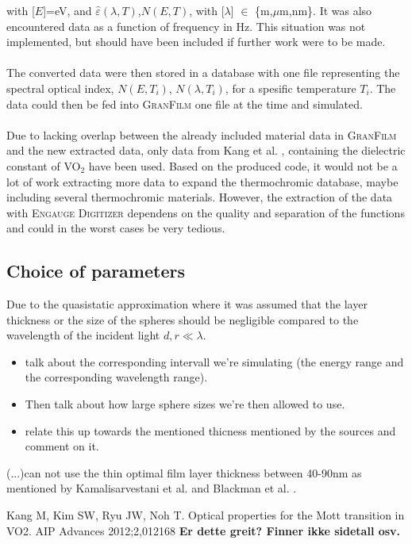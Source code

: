 with [$E$]=eV, and $\widehat\varepsilon(\lambda,T)$,$N(E,T)$, with [$\lambda$] $\in$ \{m,$\mu$m,nm\}. 
It was also encountered data as a function of frequency in Hz. This situation was not implemented, 
but should have been included if further work were to be made. 
\\
\\
The converted data were then stored in a database with one file representing the spectral 
optical index, $N(E,T_i)$, $N(\lambda,T_i)$, for a spesific temperature $T_i$. The data could then 
be fed into \textsc{GranFilm} one file at the time and simulated. 
\\
\\
Due to lacking overlap between the already included material data in \textsc{GranFilm} and the new extracted
data, only data from Kang et al. \cite[p.~3]{Kang2012}, containing the dielectric constant of 
VO$_2$ have been used. 
Based on the produced code, it would not be a lot of work extracting more data 
to expand the thermochromic database, maybe including several thermochromic materials. However, the
extraction of the data with \textsc{Engauge Digitizer} dependens on the quality and 
separation of the functions and could in the worst cases be very tedious.

\subsection{Choice of parameters}
Due to the quasistatic approximation where it was assumed that the layer thickness or the size
of the spheres should be negligible compared to the wavelength of the incident light $d,r \ll \lambda$.
\begin{itemize}
   \item talk about the corresponding intervall we're simulating (the energy range and the corresponding
      wavelength range).
   \item Then talk about how large sphere sizes we're then allowed to use.
   \item relate this up towards the mentioned thicness mentioned by the sources and comment on it.
\end{itemize}
(...)can not use the thin optimal film layer thickness between 40-90nm as mentioned by Kamalisarvestani et al. \cite{Kamalisarvestani2013} and Blackman 
et al. \cite{Blackman2009}.


\begin{thebibliography}{9}

   Kang M, Kim SW, Ryu JW, Noh T.
   Optical properties for the Mott transition in VO2.
   AIP Advances 2012;2,012168 \textbf{Er dette greit? Finner ikke sidetall osv.}
\end{thebibliography}


